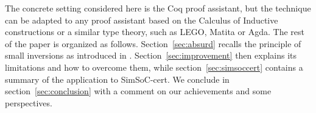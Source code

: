 The concrete setting considered here is the Coq proof assistant,
but the technique can be adapted to any proof assistant based
on the Calculus of Inductive constructions or a similar type theory, 
such as LEGO, Matita or Agda.
The rest of the paper is organized as follows.
Section~\ref{sec:absurd}
recalls the principle of small inversions as introduced in \cite{small_inv}.
Section~\ref{sec:improvement} then explains its limitations
and how to overcome them,
while section~\ref{sec:simsoccert} contains a summary
of the application to SimSoC-cert.
We conclude in section~\ref{sec:conclusion} with a comment
on our achievements and some perspectives.




